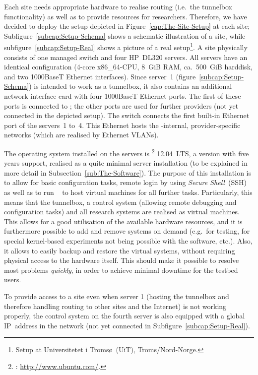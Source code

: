 Each  site needs appropriate hardware to realise routing (i.e.\ the tunnelbox functionality) as well as to provide resources for researchers. Therefore, we have decided to deploy the setup depicted in Figure~\ref{cap:The-Site-Setup} at each site; Subfigure~\ref{subcap:Setup-Schema} shows a schematic illustration of a site, while subfigure~\ref{subcap:Setup-Real} shows a picture of a real setup\footnote{Setup at Universitetet i Tromsø~(UiT), Troms/Nord-Norge.}.
A site physically consists of one managed switch and four HP~DL320 servers. All servers have an identical configuration (4-core x86\_64-CPU, 8~GiB RAM, ca.\ 500~GiB harddisk, and two 1000BaseT Ethernet interfaces). Since server~1 (figure~\ref{subcap:Setup-Schema}) is intended to work as a tunnelbox, it also contains an additional network interface card with four 1000BaseT Ethernet ports. The first of these ports is connected to ; the other ports are used for further providers (not yet connected in the depicted setup). The switch connects the first built-in Ethernet port of the servers~1 to~4. This Ethernet hosts the -internal, provider-specific networks (which are realised by Ethernet VLANs).

The operating system installed on the servers is \footnote{: \url{http://www.ubuntu.com/}.} 12.04~LTS, a version with five years support, realised as a quite minimal server installation (to be explained in more detail in Subsection~\ref{sub:The-Software}). The purpose of this installation is to allow for basic configuration tasks, remote login by using \emph{Secure Shell}~(SSH)~\cite{RFC4254} as well as to run ~\cite{VirtualBoxUserManual} to host virtual machines for all further tasks. Particularly, this means that the tunnelbox, a control system (allowing remote debugging and configuration tasks) and all research systems are realised as virtual machines. This allows for a good utilisation of the available hardware resources, and it is furthermore possible to add and remove systems on demand (e.g.\ for testing, for special kernel-based experiments not being possible with the  software, etc.). Also, it allows to easily backup and restore the virtual systems, without requiring physical access to the hardware itself. This should make it possible to resolve most problems \emph{quickly}, in order to achieve minimal downtime for the testbed users.

To provide access to a site even when server 1 (hosting the tunnelbox and therefore handling routing to other  sites and the Internet) is not working properly, the control system on the fourth server is also equipped with a global IP~address in the  network (not yet connected in Subfigure~\ref{subcap:Setup-Real}).

